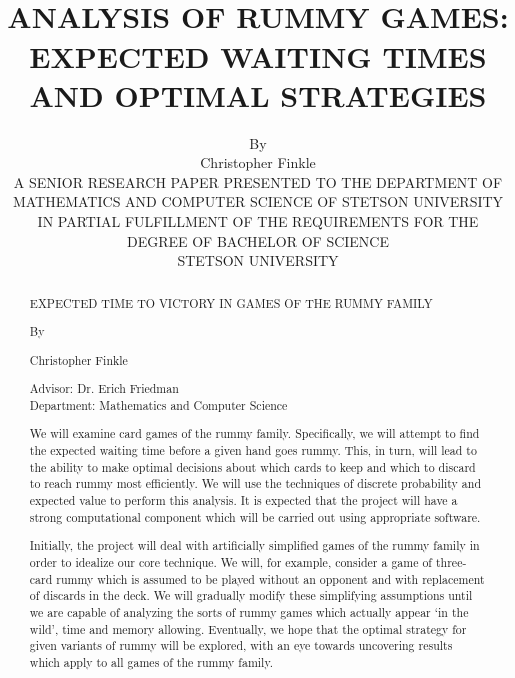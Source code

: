 \documentclass[paper=a4, fontsize=11pt,twoside]{report}   %
\title{
            \HRule{0.5pt} \\                        %
            \LARGE \textbf{\uppercase{ANALYSIS OF RUMMY GAMES: EXPECTED WAITING TIMES AND OPTIMAL STRATEGIES }}    %
            \HRule{2pt} \\ [0.5cm]      %
        }
\author{
	By\\
        Christopher Finkle\\
	\bigskip
	A SENIOR RESEARCH PAPER PRESENTED TO THE DEPARTMENT OF MATHEMATICS AND COMPUTER SCIENCE OF STETSON UNIVERSITY IN PARTIAL FULFILLMENT OF THE REQUIREMENTS FOR THE DEGREE OF BACHELOR OF SCIENCE\\
	\bigskip
	STETSON UNIVERSITY\\
}
\makeatletter
\def\printtitle{%
    {\centering \@title\par}}
\def\printauthor{%
    {\centering \large \@author}}
\makeatother
\begin{document}
\thispagestyle{empty}       %

\printtitle                 %
    \vfill
\printauthor                %
\newpage
\tableofcontents
{}
\newpage
\listoffigures
\newpage
\setcounter{page}{1}        %

\begin{abstract}
\doublespacing
\begin{center}
EXPECTED TIME TO VICTORY IN GAMES OF THE RUMMY FAMILY 
 
By 
 
Christopher Finkle 
\end{center}  
Advisor: Dr. Erich Friedman\\
Department: Mathematics and Computer Science\\
 \smallskip

We will examine card games of the rummy family. Specifically, we will attempt to find the expected waiting time before a given hand goes rummy. This, in turn, will lead to the ability to make optimal decisions about which cards to keep and which to discard to reach rummy most efficiently. We will use the techniques of discrete probability and expected value to perform this analysis. It is expected that the project will have a strong computational component which will be carried out using appropriate software.  

Initially, the project will deal with artificially simplified games of the rummy family in order to idealize our core technique. We will, for example, consider a game of three-card rummy which is assumed to be played without an opponent and with replacement of discards in the deck. We will gradually modify these simplifying assumptions until we are capable of analyzing the sorts of rummy games which actually appear ‘in the wild’, time and memory allowing. Eventually, we hope that the optimal strategy for given variants of rummy will be explored, with an eye towards uncovering results which apply to all games of the rummy family. 
\end{abstract}
\end{document}

